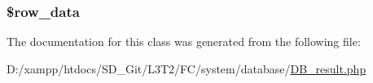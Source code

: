 \subsubsection[{\$row\+\_\+data}]{\setlength{\rightskip}{0pt plus 5cm}\$row\+\_\+data}\label{class_c_i___d_b__result_a335b4c27a1529df9e484e044e470ec07}


The documentation for this class was generated from the following file\+:\begin{DoxyCompactItemize}
\item 
D\+:/xampp/htdocs/\+S\+D\+\_\+\+Git/\+L3\+T2/\+F\+C/system/database/\hyperlink{_d_b__result_8php}{D\+B\+\_\+result.\+php}\end{DoxyCompactItemize}
